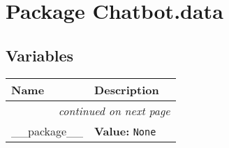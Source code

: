 %
%
%


\section{Package Chatbot.data}

    \label{Chatbot:data}


  \subsection{Variables}

    \vspace{-1cm}
\hspace{\varindent}\begin{longtable}{|p{\varnamewidth}|p{\vardescrwidth}|l}
\cline{1-2}
\cline{1-2} \centering \textbf{Name} & \centering \textbf{Description}& \\
\cline{1-2}
\endhead\cline{1-2}\multicolumn{3}{r}{\small\textit{continued on next page}}\\\endfoot\cline{1-2}
\endlastfoot\raggedright \_\-\_\-p\-a\-c\-k\-a\-g\-e\-\_\-\_\- & \raggedright \textbf{Value:} 
{\tt None}&\\
\cline{1-2}
\end{longtable}

